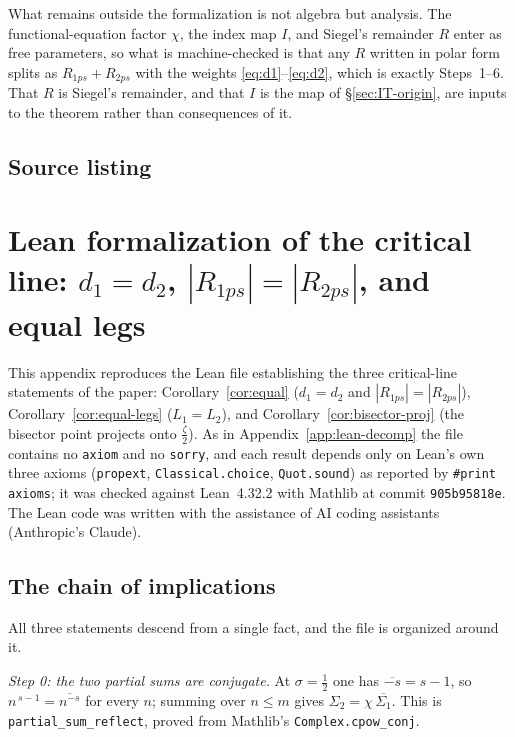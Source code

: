 \documentclass[11pt]{article}
\theoremstyle{definition}
\begin{document}
What remains outside the formalization is not algebra but analysis. The
functional-equation factor $\chi$, the index map $I$, and Siegel's remainder $R$
enter as free parameters, so what is machine-checked is that any $R$ written in
polar form splits as $R_{1ps}+R_{2ps}$ with the weights
\eqref{eq:d1}--\eqref{eq:d2}, which is exactly Steps~1--6. That $R$ is Siegel's
remainder, and that $I$ is the map of \S\ref{sec:IT-origin}, are inputs to the
theorem rather than consequences of it.

\subsection{Source listing}



\clearpage

\section{Lean formalization of the critical line: \texorpdfstring{$d_1=d_2$, $|R_{1ps}|=|R_{2ps}|$, and equal legs}{d1 = d2, |R1ps| = |R2ps|, and equal legs}}
\label{app:lean-critical}

This appendix reproduces the Lean file establishing the three critical-line
statements of the paper: Corollary~\ref{cor:equal}
($d_1=d_2$ and $|R_{1ps}|=|R_{2ps}|$), Corollary~\ref{cor:equal-legs}
($L_1=L_2$), and Corollary~\ref{cor:bisector-proj} (the bisector point projects
onto $\tfrac{\zeta}{2}$). As in Appendix~\ref{app:lean-decomp} the file contains
no \texttt{axiom} and no \texttt{sorry}, and each result depends only on Lean's
own three axioms (\texttt{propext}, \texttt{Classical.choice},
\texttt{Quot.sound}) as reported by \texttt{\#print axioms}; it was checked
against Lean~4.32.2 with Mathlib at commit \texttt{905b95818e}. The Lean code was
written with the assistance of AI coding assistants (Anthropic's Claude).

\subsection{The chain of implications}

All three statements descend from a single fact, and the file is organized around
it.

\emph{Step 0: the two partial sums are conjugate.} At $\sigma=\tfrac12$ one has
$\overline{-s}=s-1$, so $n^{\,s-1}=\overline{n^{-s}}$ for every $n$; summing over
$n\le m$ gives $\Sigma_2=\chi\,\overline{\Sigma_1}$. This is
\texttt{partial\_sum\_reflect}, proved from Mathlib's \texttt{Complex.cpow\_conj}.
\end{document}
